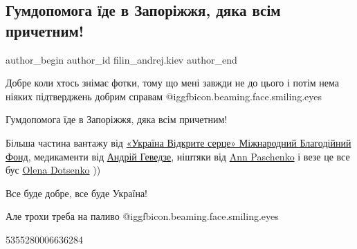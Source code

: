  
 
 
 
 
 
\subsection{Гумдопомога їде в Запоріжжя, дяка всім причетним!}
\label{sec:12_05_2022.fb.filin_andrej.kiev.1.gumdopomoga}
 
\ifcmt
 author_begin
   author_id filin_andrej.kiev
 author_end
\fi

Добре коли хтось знімає фотки, тому що мені завжди не до цього і потім нема
ніяких підтверджень добрим справам  @igg{fbicon.beaming.face.smiling.eyes} 

Гумдопомога їде в Запоріжжя, дяка всім причетним!

Більша частина вантажу від
\href{https://www.facebook.com/ukrainianopenhearthelp/}{«Україна Відкрите
серце» Міжнародний Благодійний Фонд}, медикаменти від
\href{https://www.facebook.com/andry.hevedze}{Андрій Геведзе}, ніштяки від
\href{https://www.facebook.com/ann.paschenko}{Ann Paschenko} і везе це все бус
\href{https://www.facebook.com/profile.php?id=100005643365993}{Olena Dotsenko} ))

Все буде добре, все буде Україна!

Але трохи треба на паливо  @igg{fbicon.beaming.face.smiling.eyes} 

5355280006636284
